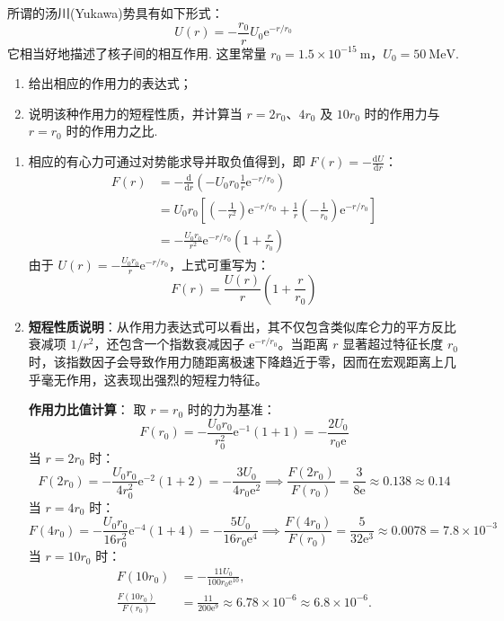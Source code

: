 \begin{exercise}\label{ex:3.11}
所谓的汤川(Yukawa)势具有如下形式：
$$U(r) = -\frac{r_0}{r} U_0 \mathrm{e}^{-r/r_0}$$
它相当好地描述了核子间的相互作用. 这里常量 $r_0 = 1.5 \times 10^{-15} \ \mathrm{m}$，$U_0 = 50 \ \mathrm{MeV}$.
\begin{enumerate}
  \item[(a)] 给出相应的作用力的表达式；
  \item[(b)] 说明该种作用力的短程性质，并计算当 $r=2r_0$、$4r_0$ 及 $10r_0$ 时的作用力与 $r=r_0$ 时的作用力之比.
\end{enumerate}
\end{exercise}
\begin{solution}
\begin{enumerate}
    \item[(a)] 相应的有心力可通过对势能求导并取负值得到，即 $F(r) = -\frac{\mathrm{d}U}{\mathrm{d}r}$：
    \begin{align*}
        F(r) &= - \frac{\mathrm{d}}{\mathrm{d}r} \left( -U_0 r_0 \frac{1}{r} \mathrm{e}^{-r/r_0} \right) \\
             &= U_0 r_0 \left[ \left(-\frac{1}{r^2}\right) \mathrm{e}^{-r/r_0} + \frac{1}{r} \left(-\frac{1}{r_0}\right) \mathrm{e}^{-r/r_0} \right] \\
             &= - \frac{U_0 r_0}{r^2} \mathrm{e}^{-r/r_0} \left( 1 + \frac{r}{r_0} \right)
    \end{align*}
    由于 $U(r) = - \frac{U_0 r_0}{r} \mathrm{e}^{-r/r_0}$，上式可重写为：
    $$ F(r) = \frac{U(r)}{r} \left( 1 + \frac{r}{r_0} \right) $$

    \item[(b)] \textbf{短程性质说明}：从作用力表达式可以看出，其不仅包含类似库仑力的平方反比衰减项 $1/r^2$，还包含一个指数衰减因子 $\mathrm{e}^{-r/r_0}$。当距离 $r$ 显著超过特征长度 $r_0$ 时，该指数因子会导致作用力随距离极速下降趋近于零，因而在宏观距离上几乎毫无作用，这表现出强烈的短程力特征。
    
    \textbf{作用力比值计算}：
    取 $r = r_0$ 时的力为基准：
    $$ F(r_0) = - \frac{U_0 r_0}{r_0^2} \mathrm{e}^{-1} (1 + 1) = - \frac{2 U_0}{r_0 \mathrm{e}} $$
    当 $r = 2r_0$ 时：
    $$ F(2r_0) = - \frac{U_0 r_0}{4 r_0^2} \mathrm{e}^{-2} (1 + 2) = - \frac{3 U_0}{4 r_0 \mathrm{e}^2} \implies \frac{F(2r_0)}{F(r_0)} = \frac{3}{8 \mathrm{e}} \approx 0.138 \approx 0.14 $$
    当 $r = 4r_0$ 时：
    $$ F(4r_0) = - \frac{U_0 r_0}{16 r_0^2} \mathrm{e}^{-4} (1 + 4) = - \frac{5 U_0}{16 r_0 \mathrm{e}^4} \implies \frac{F(4r_0)}{F(r_0)} = \frac{5}{32 \mathrm{e}^3} \approx 0.0078 = 7.8 \times 10^{-3} $$
    当 $r = 10r_0$ 时：
    \[
    \begin{aligned}
    F(10r_0)
      &= -\frac{11U_0}{100r_0\mathrm{e}^{10}},\\
    \frac{F(10r_0)}{F(r_0)}
      &= \frac{11}{200\mathrm e^9}
       \approx 6.78\times10^{-6}
       \approx 6.8\times10^{-6}.
    \end{aligned}
    \]
\end{enumerate}
\end{solution}

